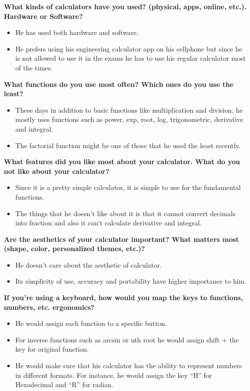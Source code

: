 \documentclass{article}
\begin{document}
\textbf{What kinds of calculators have you used? (physical, apps, online, etc.). Hardware or Software?}
\begin{itemize}
\itemsep0em 
\item He has used both hardware and software. 
\item He prefers using his engineering calculator app on his cellphone but since he is not allowed to use it in the exams he has to use his regular calculator most of the times.
\end{itemize}

\textbf{What functions do you use most often? Which ones do you use the least?}
\begin{itemize}
\itemsep0em 
\item These days in addition to basic functions like multiplication and division, he mostly uses functions such as power, exp, root, log, trigonometric, derivative and integral. 
\item The factorial function might be one of those that he used the least recently.
\end{itemize}

\textbf{What features did you like most about your calculator. What do you not like about your calculator?}
\begin{itemize}
\itemsep0em 
\item Since it is a pretty simple calculator, it is simple to use for the fundamental functions. 
\item The things that he doesn't like about it is that it cannot convert decimals into fraction and also it can`t calculate derivative and integral.
\end{itemize}

\textbf{Are the aesthetics of your calculator important? What matters most (shape, color,  personalized themes, etc.)?}
\begin{itemize}
\itemsep0em 
\item He doesn't care about the aesthetic of calculator.
\item Its simplicity of use, accuracy and portability have higher importance to him.
\end{itemize}

\textbf{If you’re using a keyboard, how would you map the keys to functions, numbers, etc. ergonomics?}
\begin{itemize}
\itemsep0em 
\item He would assign each function to a specific button. 
\item For inverse functions such as arcsin or nth root he would assign shift + the key for original function. 
\item He would make sure that his calculator has the ability to represent numbers in different formats. For instance, he would assign the key “H” for Hexadecimal and “R” for radian.  
\end{itemize}
\pagebreak
\end{document}
